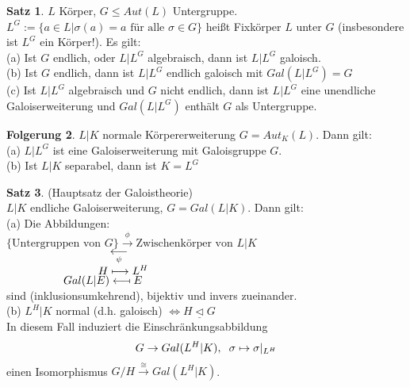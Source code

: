 \documentclass[10pt,a4paper,numbers=endperiod]{scrreprt}
\theoremstyle{definition}
\newtheorem{satz}{Satz}[section]
\newtheorem{folg}[satz]{Folgerung}
\begin{document}
\begin{satz}
	$L$ Körper, $G \leq Aut(L)$ Untergruppe.\\
	$L^G := \{a \in L| \sigma(a) = a \text{ für alle } \sigma \in G\}$ heißt Fixkörper $L$ unter $G$ (insbesondere ist $L^G$ ein Körper!). Es gilt:\\
	(a) Ist $G$ endlich, oder $L|L^G$ algebraisch, dann ist $L|L^G$ galoisch.\\
	(b) Ist $G$ endlich, dann ist $L|L^G$ endlich galoisch mit $Gal(L|L^G) = G$\\
	(c) Ist $L|L^G$ algebraisch und $G$ nicht endlich, dann ist $L|L^G$ eine unendliche Galoiserweiterung und $Gal(L|L^G)$ enthält $G$ als Untergruppe.
\end{satz}

\begin{folg}
	$L|K$ normale Körpererweiterung $G = Aut_K(L)$. Dann gilt:\\
	(a) $L|L^G$ ist eine Galoiserweiterung mit Galoisgruppe $G$.\\
	(b) Ist $L|K$ separabel, dann ist $K = L^G$
\end{folg}

\begin{satz}
	(Hauptsatz der Galoistheorie)\\
	$L|K$ endliche Galoiserweiterung, $G = Gal(L|K)$. Dann gilt:\\
	(a) Die Abbildungen:\\
	$\{\text{Untergruppen von $G$}\} \overset{\phi}{\longrightarrow} \text{Zwischenkörper von $L|K$}$\\
	$\hspace*{32.7mm} \underset{\psi}{\longleftarrow}$\\
	$\hspace*{29mm}H \longmapsto L^H$\\
	$\hspace*{18mm}Gal(L|E) \longmapsfrom E$\\
	sind (inklusionsumkehrend), bijektiv und invers zueinander.\\
	(b) $L^H|K$ normal (d.h. galoisch) $\Leftrightarrow H \underline{\vartriangleleft} G$\\
	In diesem Fall induziert die Einschränkungsabbildung\\
	\begin{align*}
	G \rightarrow Gal(L^H|K), \hspace{2mm} \sigma \mapsto \sigma|_{L^H}
	\end{align*}
	einen Isomorphismus $G/H \overset{\cong}{\rightarrow} Gal(L^H|K)$.
\end{satz}
\end{document}
